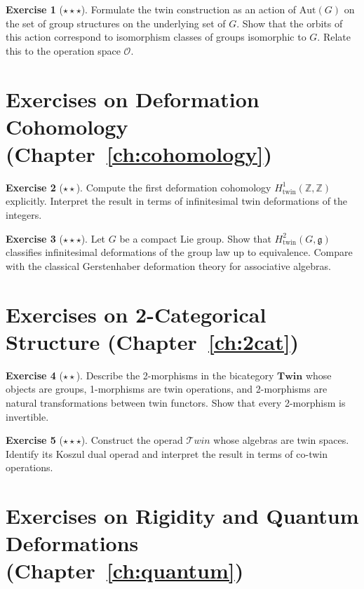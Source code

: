 \documentclass[11pt,a4paper,openany]{book}
\theoremstyle{plain}
\theoremstyle{definition}
\newtheorem{exercise}{Exercise}[chapter]
\newcommand{\opspace}{\mathcal{O}}
\newcommand{\ZZ}{\mathbb{Z}}
\newcommand{\Aut}{\mathrm{Aut}}
\begin{document}
\begin{exercise}[$\star\star\star$]
Formulate the twin construction as an action of $\Aut(G)$ on the set of group structures on the underlying set of $G$. Show that the orbits of this action correspond to isomorphism classes of groups isomorphic to $G$. Relate this to the operation space $\opspace$.
\end{exercise}

\section*{Exercises on Deformation Cohomology (Chapter~\ref{ch:cohomology})}

\begin{exercise}[$\star\star$]
Compute the first deformation cohomology $H^1_{\mathrm{twin}}(\ZZ, \ZZ)$ explicitly. Interpret the result in terms of infinitesimal twin deformations of the integers.
\end{exercise}

\begin{exercise}[$\star\star\star$]
Let $G$ be a compact Lie group. Show that $H^2_{\mathrm{twin}}(G, \mathfrak{g})$ classifies infinitesimal deformations of the group law up to equivalence. Compare with the classical Gerstenhaber deformation theory for associative algebras.
\end{exercise}

\section*{Exercises on 2-Categorical Structure (Chapter~\ref{ch:2cat})}

\begin{exercise}[$\star\star$]
Describe the 2-morphisms in the bicategory $\mathbf{Twin}$ whose objects are groups, 1-morphisms are twin operations, and 2-morphisms are natural transformations between twin functors. Show that every 2-morphism is invertible.
\end{exercise}

\begin{exercise}[$\star\star\star$]
Construct the operad $\mathcal{T}win$ whose algebras are twin spaces. Identify its Koszul dual operad and interpret the result in terms of co-twin operations.
\end{exercise}

\section*{Exercises on Rigidity and Quantum Deformations (Chapter~\ref{ch:quantum})}
\end{document}
